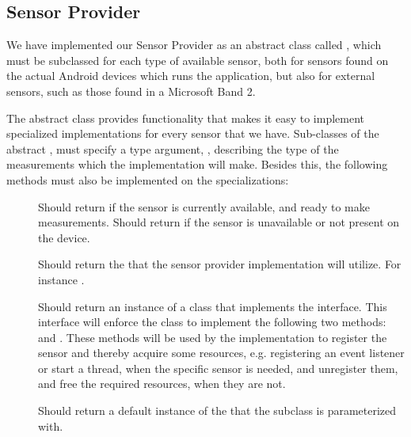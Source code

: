 \subsection{Sensor Provider}
\label{sub:providing_sensor_data_implementation}

We have implemented our Sensor Provider as an abstract class called , which must be subclassed for each type of available sensor, both for sensors found on the actual Android devices which runs the application, but also for external sensors, such as those found in a Microsoft Band 2. 


The abstract class provides functionality that makes it easy to implement specialized implementations for every sensor that we have. Sub-classes of the abstract , must specify a type argument, , describing the type of the measurements which the implementation will make. Besides this, the following methods must also be implemented on the specializations:


\begin{description}
	\item[] Should return  if the sensor is currently available, and ready to make measurements. Should return  if the sensor is unavailable or not present on the device.

	\item[] Should return the  that the sensor provider implementation will utilize. For instance .

	\item[] Should return an instance of a class that implements the  interface. This interface will enforce the class to implement the following two methods:  and . These methods will be used by the  implementation to register the sensor and thereby acquire some resources, e.g. registering an event listener or start a thread, when the specific sensor is needed, and unregister them, and free the required resources, when they are not.

  \item[] Should return a default instance of the  that the subclass is parameterized with.

\end{description}

